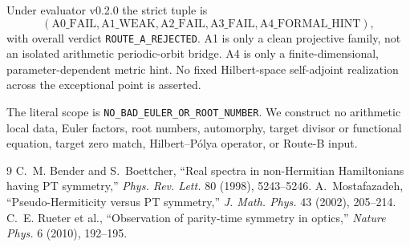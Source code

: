\documentclass[10pt]{article}
\begin{document}
Under evaluator v0.2.0 the strict tuple is
\[
(\mathrm{A0\_FAIL},\mathrm{A1\_WEAK},\mathrm{A2\_FAIL},
 \mathrm{A3\_FAIL},\mathrm{A4\_FORMAL\_HINT}),
\]
with overall verdict \texttt{ROUTE\_A\_REJECTED}.  A1 is only a clean
projective family, not an isolated arithmetic periodic-orbit bridge.  A4 is
only a finite-dimensional, parameter-dependent metric hint.  No fixed
Hilbert-space self-adjoint realization across the exceptional point is
asserted.

The literal scope is \texttt{NO\_BAD\_EULER\_OR\_ROOT\_NUMBER}.  We construct
no arithmetic local data, Euler factors, root numbers, automorphy, target
divisor or functional equation, target zero match, Hilbert--P\'olya operator,
or Route-B input.
\fi

\begin{thebibliography}{9}
 C.~M. Bender and S.~Boettcher,
``Real spectra in non-Hermitian Hamiltonians having PT symmetry,''
\emph{Phys. Rev. Lett.} 80 (1998), 5243--5246.
 A.~Mostafazadeh,
``Pseudo-Hermiticity versus PT symmetry,''
\emph{J. Math. Phys.} 43 (2002), 205--214.
 C.~E. Rueter et al.,
``Observation of parity-time symmetry in optics,''
\emph{Nature Phys.} 6 (2010), 192--195.
\end{thebibliography}
\end{document}
